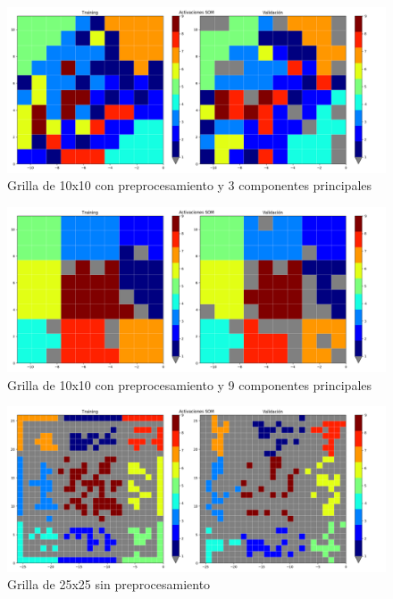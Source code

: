 \begin{figure}[H]
  \includegraphics[width=160mm]{imagenes/som_10_10_3_preprocess.png}
  \caption{Grilla de 10x10 con preprocesamiento y 3 componentes principales}
\end{figure}

\begin{figure}[H]
  \includegraphics[width=160mm]{imagenes/som_10_10_9_preprocess.png}
  \caption{Grilla de 10x10 con preprocesamiento y 9 componentes principales}
\end{figure}

\begin{figure}[H]
  \includegraphics[width=160mm]{imagenes/som_25_25.png}
  \caption{Grilla de 25x25 sin preprocesamiento}
\end{figure}

